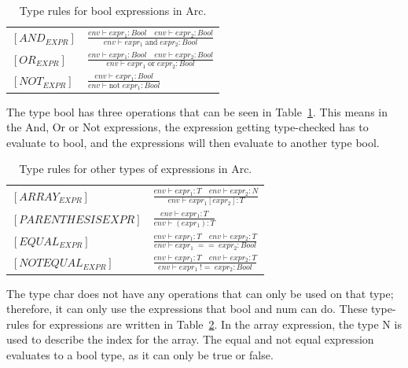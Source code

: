 \begin{table}[htb!]
    \centering
    \begin{tabular}{ll}
        \toprule
        $[AND_{EXPR}] $ & $\frac
            {env\vdash expr_1: Bool \quad env\vdash expr_2: Bool}
            {env\vdash expr_1 \;\text{and} \;expr_2: Bool}$
        \\ [12pt]
        $[OR_{EXPR}] $  & $\frac
            {env\vdash expr_1: Bool \quad env\vdash expr_2: Bool}
            {env\vdash expr_1 \;\text{or} \;expr_2: Bool}$
        \\ [12pt]
        $[NOT_{EXPR}] $ & $\frac
            {env\vdash expr_1: Bool}
            {env\vdash \text{not} \; expr_1 : Bool}$
        \\
        \bottomrule
    \end{tabular}
    \caption{Type rules for bool expressions in Arc.}
    \label{tab:bool-rules}
\end{table}


The type bool has three operations that can be seen in Table~\ref{tab:bool-rules}. This means in the And, Or or Not expressions, the expression getting type-checked has to evaluate to bool, and the expressions will then evaluate to another type bool.


\begin{table}[htb!]
    \centering
    \begin{tabular}{ll}
        \toprule
        $[ARRAY_{EXPR}]$      & $ \frac
            {env\vdash expr_1: T \quad env \vdash expr_2 : N}
            {env\vdash expr_1[expr_2] : T}$
        \\ [12pt]
        $[PARENTHESIS{EXPR}]$ & $ \frac
            {env\vdash expr_1: T}
            {env\vdash (expr_1) : T}$
        \\ [12pt]
        $[EQUAL_{EXPR}] $     & $\frac
            {env\vdash expr_1: T \quad env\vdash expr_2: T}
            {env\vdash expr_1 \;== \;expr_2: Bool}$
        \\ [12pt]
        $[NOTEQUAL_{EXPR}] $  & $\frac
            {env\vdash expr_1: T \quad env\vdash expr_2: T}
            {env\vdash expr_1 \;!= \;expr_2: Bool}$
        \\
        \bottomrule
    \end{tabular}
    \caption{Type rules for other types of expressions in Arc.}
    \label{tab:expr-rules}
\end{table}

The type char does not have any operations that can only be used on that type; therefore, it can only use the expressions that bool and num can do. These type-rules for expressions are written in Table~\ref{tab:expr-rules}. In the array expression, the type N is used to describe the index for the array. The equal and not equal expression evaluates to a bool type, as it can only be true or false.


